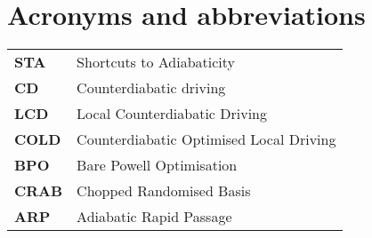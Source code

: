 \chapter{Acronyms and abbreviations}

\begin{table}[h]
      \begin{tabular}{p{3cm}  p{8cm}}

        \textbf{STA}\label{acr:sta} & Shortcuts to Adiabaticity \\[7pt]
        \textbf{CD}\label{acr:cd} & Counterdiabatic driving \\[7pt]
        \textbf{LCD}\label{acr:lcd} & Local Counterdiabatic Driving \\[7pt]
        \textbf{COLD}\label{acr:cold} & Counterdiabatic Optimised Local Driving \\[7pt]
        \textbf{BPO}\label{acr:bpo} & Bare Powell Optimisation \\[7pt]
        \textbf{CRAB}\label{acr:crab} & Chopped Randomised Basis \\ [7pt]
        \textbf{ARP}\label{acr:arp} & Adiabatic Rapid Passage \\ [7pt]

    \end{tabular}

\end{table}\label{table}